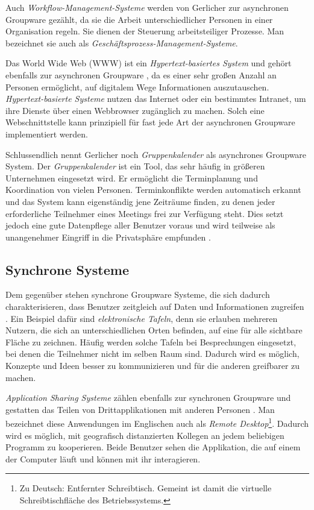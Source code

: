 Auch \emph{Workflow-Management-Systeme} werden von Gerlicher \citep{Gerlicher:2007p241} zur asynchronen Groupware gezählt, da sie die Arbeit unterschiedlicher Personen in einer Organisation regeln. Sie dienen der Steuerung arbeitsteiliger Prozesse. Man bezeichnet sie auch als \emph{Geschäftsprozess-Management-Systeme}.

Das World Wide Web (WWW) ist ein \emph{Hypertext-basiertes System} und gehört ebenfalls zur asynchronen Groupware \citep{Gerlicher:2007p241}, da es einer sehr großen Anzahl an Personen ermöglicht, auf digitalem Wege Informationen auszutauschen. \emph{Hypertext-basierte Systeme} nutzen das Internet oder ein bestimmtes Intranet, um ihre Dienste über einen Webbrowser zugänglich zu machen. Solch eine Webschnittstelle kann prinzipiell für fast jede Art der asynchronen Groupware implementiert werden. 

Schlussendlich nennt Gerlicher noch \emph{Gruppenkalender} als asynchrones Groupware System. Der \emph{Gruppenkalender} ist ein Tool, das sehr häufig in größeren Unternehmen eingesetzt wird. Er ermöglicht die Terminplanung und Koordination von vielen Personen. Terminkonflikte werden automatisch erkannt und das System kann eigenständig jene Zeiträume finden, zu denen jeder erforderliche Teilnehmer eines Meetings frei zur Verfügung steht. Dies setzt jedoch eine gute Datenpflege aller Benutzer voraus und wird teilweise als unangenehmer Eingriff in die Privatsphäre empfunden \citep{Gerlicher:2007p241}.
\clearpage

\subsection{Synchrone Systeme} 

Dem gegenüber stehen synchrone Groupware Systeme, die sich dadurch charakterisieren, dass Benutzer zeitgleich auf Daten und Informationen zugreifen \citep{Gerlicher:2007p241}. Ein Beispiel dafür sind \emph{elektronische Tafeln}, denn sie erlauben mehreren Nutzern, die sich an unterschiedlichen Orten befinden, auf eine für alle sichtbare Fläche zu zeichnen. Häufig werden solche Tafeln bei Besprechungen eingesetzt, bei denen die Teilnehmer nicht im selben Raum sind. Dadurch wird es möglich, Konzepte und Ideen besser zu kommunizieren und für die anderen greifbarer zu machen.

\emph{Application Sharing Systeme} zählen ebenfalls zur synchronen Groupware und gestatten das Teilen von Drittapplikationen mit anderen Personen \citep{Gerlicher:2007p241}. Man bezeichnet diese Anwendungen im Englischen auch als \emph{Remote Desktop}\footnote{Zu Deutsch: Entfernter Schreibtisch. Gemeint ist damit die virtuelle Schreibtischfläche des Betriebssystems.}. Dadurch wird es möglich, mit geografisch distanzierten Kollegen an jedem beliebigen Programm zu kooperieren. Beide Benutzer sehen die Applikation, die auf einem der Computer läuft und können mit ihr interagieren. 


